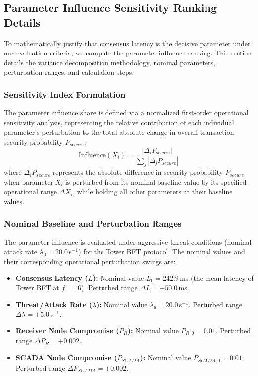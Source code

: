 \documentclass[10pt,twocolumn,letterpaper]{article}
\begin{document}
\begin{enumerate}[leftmargin=*]
\subsection{Parameter Influence Sensitivity Ranking Details}
To mathematically justify that consensus latency is the decisive parameter under our evaluation criteria, we compute the parameter influence ranking. This section details the variance decomposition methodology, nominal parameters, perturbation ranges, and calculation steps.

\subsubsection{Sensitivity Index Formulation}
The parameter influence share is defined via a normalized first-order operational sensitivity analysis, representing the relative contribution of each individual parameter's perturbation to the total absolute change in overall transaction security probability $P_{secure}$:
\begin{equation}
\text{Influence}(X_i) = \frac{|\Delta_i P_{secure}|}{\sum_{j} |\Delta_j P_{secure}|}
\label{eq:sens_influence}
\end{equation}
where $\Delta_i P_{secure}$ represents the absolute difference in security probability $P_{secure}$ when parameter $X_i$ is perturbed from its nominal baseline value by its specified operational range $\Delta X_i$, while holding all other parameters at their baseline values.

\subsubsection{Nominal Baseline and Perturbation Ranges}
The parameter influence is evaluated under aggressive threat conditions (nominal attack rate $\lambda_0 = 20.0$\,s$^{-1}$) for the Tower BFT protocol. The nominal values and their corresponding operational perturbation swings are:
\begin{itemize}[leftmargin=*]
    \item \textbf{Consensus Latency ($L$):} Nominal value $L_0 = 242.9$\,ms (the mean latency of Tower BFT at $f=16$). Perturbed range $\Delta L = +50.0$\,ms.
    \item \textbf{Threat/Attack Rate ($\lambda$):} Nominal value $\lambda_0 = 20.0$\,s$^{-1}$. Perturbed range $\Delta \lambda = +5.0$\,s$^{-1}$.
    \item \textbf{Receiver Node Compromise ($P_R$):} Nominal value $P_{R,0} = 0.01$. Perturbed range $\Delta P_R = +0.002$.
    \item \textbf{SCADA Node Compromise ($P_{SCADA}$):} Nominal value $P_{SCADA,0} = 0.01$. Perturbed range $\Delta P_{SCADA} = +0.002$.
\end{itemize}


\end{enumerate}
\end{document}
